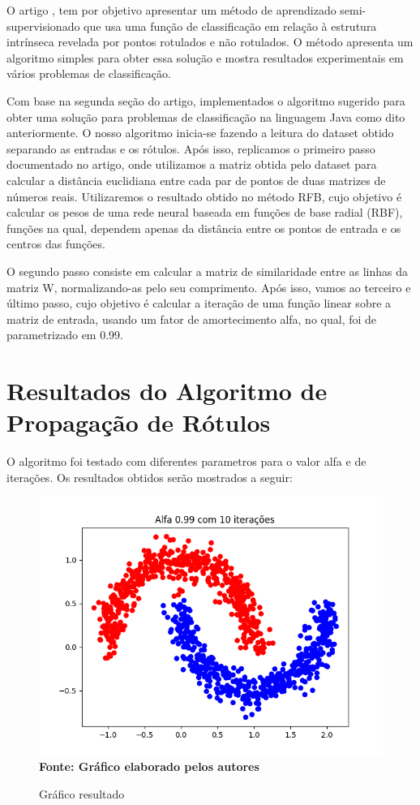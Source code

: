 \documentclass[12pt]{article}
\begin{document}
O artigo \cite{paper}, tem por objetivo apresentar um método de aprendizado semi-supervisionado que usa uma função de classificação em relação à estrutura intrínseca revelada por pontos rotulados e não rotulados. O método apresenta um algoritmo simples para obter essa solução e mostra resultados experimentais em vários problemas de classificação. 

Com base na segunda seção do artigo, implementados o algoritmo sugerido para obter uma solução para problemas de classificação na linguagem Java como dito anteriormente. O nosso algoritmo inicia-se fazendo a leitura do dataset obtido separando as entradas e os rótulos. Após isso, replicamos o primeiro passo documentado no artigo, onde utilizamos a matriz obtida pelo dataset para calcular a distância euclidiana entre cada par de pontos de duas matrizes de números reais. Utilizaremos o resultado obtido no método RFB, cujo objetivo é calcular os pesos de uma rede neural baseada em funções de base radial (RBF), funções na qual, dependem apenas da distância entre os pontos de entrada e os centros das funções.

O segundo passo consiste em calcular a matriz de similaridade entre as linhas da matriz W, normalizando-as pelo seu comprimento. Após isso, vamos ao terceiro e último passo, cujo objetivo é calcular a iteração de uma função linear sobre a matriz de entrada, usando um fator de amortecimento alfa, no qual, foi de parametrizado em 0.99.

\section{Resultados do Algoritmo de Propagação de Rótulos}

O algoritmo foi testado com diferentes parametros para o valor alfa e de iterações. Os resultados obtidos serão mostrados a seguir:


\begin{figure}[ht]
	\centering	
	\caption[\hspace{0.1cm}Gráfico Acurácia.]{Gráfico resultado}
	\vspace{-0.4cm}
	\includegraphics[width=.6\textwidth]{10_099.png}
	\\\textbf{\footnotesize  Fonte: Gráfico elaborado pelos autores }
	\label{fig:figura1}
\end{figure}
\end{document}
